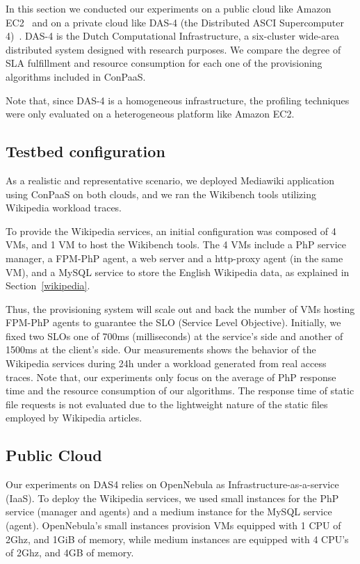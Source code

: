 In this section we conducted our experiments on a public cloud like Amazon EC2~\cite{amazonEC2} and on a private cloud like DAS-4 (the Distributed ASCI Supercomputer 4)~\cite{das4}. DAS-4 is the Dutch Computational Infrastructure, a six-cluster wide-area distributed system designed with research purposes.  We compare the degree of SLA fulfillment and resource consumption for each one of the provisioning algorithms included in ConPaaS.

Note that, since DAS-4 is a homogeneous infrastructure, the profiling techniques were only evaluated on a heterogeneous platform like Amazon EC2. 


\subsection{Testbed configuration}

As a realistic and representative scenario, we deployed Mediawiki application using ConPaaS on both clouds, and we ran the Wikibench tools utilizing Wikipedia workload traces.  

To provide the Wikipedia services, an initial configuration was composed of 4 VMs, and 1 VM to host the Wikibench tools. The 4 VMs include a PhP service manager, a FPM-PhP agent, a web server and a http-proxy agent (in the same VM), and a MySQL service to store the English Wikipedia data, as explained in Section~\ref{wikipedia}.

Thus, the provisioning system will scale out and back the number of VMs hosting FPM-PhP agents to guarantee the SLO (Service Level Objective). Initially, we fixed two SLOs one of 700ms (milliseconds) at the service's side and another of 1500ms at the client's side. Our measurements shows the behavior of the Wikipedia services during 24h under a workload generated from real access traces. Note that, our experiments only focus on the average of PhP response time and the resource consumption of our algorithms. The response time of static file requests is not evaluated due to the lightweight nature of the static files employed by Wikipedia articles. 

\subsection{Public Cloud}

Our experiments on DAS4 relies on OpenNebula as Infrastructure-as-a-service (IaaS). To deploy the Wikipedia services, we used small instances for the PhP service (manager and agents) and a medium instance for the MySQL service (agent). OpenNebula's small instances provision VMs equipped with 1 CPU of 2Ghz, and 1GiB of memory, while medium instances are equipped with 4 CPU's of 2Ghz, and 4GB of memory.

